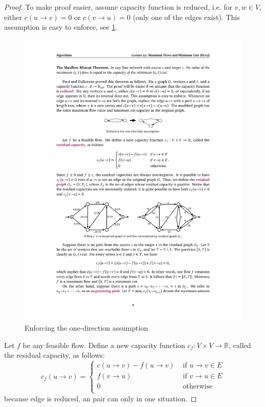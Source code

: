 \begin{proof}

To make proof easier, assume capacity function is reduced,
i.e. for $v,w \in V$, either $c(u \rightarrow v) = 0$ or $c(v \rightarrow u) = 0$
(only one of the edges exist). This assumption is easy to enforce,
see \cref{fig:onedirection}.
\begin{figure}[H]
    \centering
    \includegraphics[scale=1.5]{fig/onedirectionassumption}
    \caption{Enforcing the one-direction assumption}
    \label{fig:onedirection}
\end{figure}

Let $f$ be any feasible flow. Define a new capacity function
$c_f:V \times V \rightarrow \mathbb{R}$, called the residual capacity,
as follows:
\begin{equation}
    c_f(u \rightarrow v) = \begin{cases}
        c(u \rightarrow v) - f(u \rightarrow v) & \text{ if } u \rightarrow v \in E\\
        f(v \rightarrow u) & \text{ if } v \rightarrow u \in E\\
        0 & \text{ otherwise } \\
        \end{cases}
\end{equation}
because edge is reduced, an pair can only in one situation.


\end{proof}
